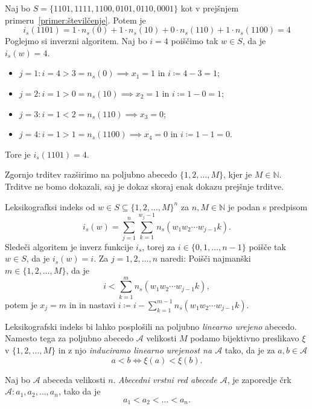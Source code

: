 \documentclass[fin1, tisk]{fmfdelo}
\newcommand{\N}{\mathbb{N}}
\newcommand{\A}{\mathcal{A}}
\theoremstyle{definition}
\begin{document}
\begin{primer}
    Naj bo $S = \{ 1101, 1111, 1100, 0101, 0110, 0001 \}$ kot v prejšnjem 
    primeru~\ref{primer:številčenje}. Potem je 
    \[
        i_s(1101) = 1 \cdot n_s(0) + 1 \cdot n_s(10) + 0 \cdot n_s(110) + 1 \cdot n_s(1100) = 4
    \]
    Poglejmo si inverzni algoritem. Naj bo $i = 4$ poiščimo tak $w \in S$, da je $i_s(w) = 4$.
    \begin{itemize}
        \item $j=1 \colon i = 4 > 3 = n_s(0) \implies x_1 = 1$ in $i \coloneq 4 - 3 = 1$;
        \item $j=2 \colon i = 1 > 0 = n_s(10) \implies x_2 = 1$ in $i \coloneq 1 - 0 = 1$;
        \item $j=3 \colon i = 1 < 2 = n_s(110) \implies x_3 = 0$;
        \item $j=4 \colon i = 1 > 1 = n_s(1100) \implies x_4 = 0$ in $i \coloneq 1 - 1 = 0$.
    \end{itemize}
    Tore je $i_s(1101) = 4$.
\end{primer}

Zgornjo trditev razširimo na poljubno abecedo $\{ 1,2, \ldots, M\}$, kjer je $M \in \N$.
Trditve ne bomo dokazali, saj je dokaz skoraj enak dokazu prejšnje trditve.

\begin{trditev}
    Leksikografksi indeks od $w \in S \subseteq \{ 1,2, \ldots, M\}^n$ za $n, M \in \N$ je 
    podan s predpisom
    \[
        i_s(w) = \sum_{j=1}^{n} \sum_{k=1}^{w_j-1} n_s(w_1w_2 \cdots w_{j-1}k).
    \]
    Sledeči algoritem je inverz funkcije $i_s$, torej za $i \in \{ 0, 1, \ldots, n - 1 \}$ 
    poišče tak $w \in S$, da je $i_s(w) = i$. Za $j = 1,2, \ldots, n$ naredi: Poišči najmanški 
    $m \in \{ 1,2, \ldots, M\}$, da je 
    \[
        i < \sum_{k=1}^m n_s(w_1w_2 \cdots w_{j-1}k),
    \]
    potem je $x_j = m$ in in nastavi $i \coloneq i - \sum_{k=1}^{m-1} n_s(w_1w_2 \cdots w_{j-1}k)$.
\end{trditev} 

Leksikografski indeks bi lahko posplošili na poljubno \emph{linearno urejeno} abecedo. Namesto 
tega za poljubno abecedo $\A$ velikosti $M$ podamo bijektivno preslikavo $\xi$ v 
$\{ 1,2, \ldots, M\}$ in z njo \emph{induciramo linearno urejenost na $\A$} tako,
da je za $a,b \in \A$
\[
    a < b \iff \xi(a) < \xi(b).
\]

\begin{definicija}
    Naj bo $\A$ abeceda velikosti $n$. \emph{Abecedni vrstni red abecede $\A$}, je 
    zaporedje črk $\A \colon a_1, a_2, \ldots, a_n$, tako da je
    \[
        a_1 < a_2 < \ldots < a_n.
    \]
\end{definicija}
\end{document}

